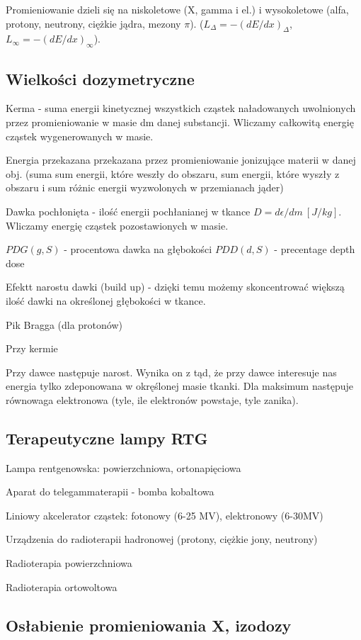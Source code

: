 \documentclass{article}
\begin{document}
Promieniowanie dzieli się na niskoletowe (X, gamma i el.) i wysokoletowe (alfa, protony, neutrony, ciężkie jądra, mezony $\pi$). ($L_{\Delta} = -(dE/dx)_{\Delta}$, $L_{\infty} = -(dE/dx)_{\infty}$).

\subsection{Wielkości dozymetryczne}

Kerma - suma energii kinetycznej wszystkich cząstek naładowanych uwolnionych przez promieniowanie w masie dm danej substancji. Wliczamy całkowitą energię cząstek wygenerowanych w masie.

Energia przekazana przekazana przez promieniowanie jonizujące materii w danej obj. (suma sum energii, które weszły do obszaru, sum energii, które wyszły z obszaru i sum różnic energii wyzwolonych w przemianach jąder)

Dawka pochłonięta - ilość energii pochłanianej w tkance $D = d\epsilon / dm~[J/kg]$. Wliczamy energię cząstek pozostawionych w masie.

$PDG(g,S)$ - procentowa dawka na głębokości
$PDD(d,S)$ - precentage depth dose

Efektt narostu dawki (build up) - dzięki temu możemy skoncentrować większą ilość dawki na określonej głębokości w tkance.

Pik Bragga (dla protonów)

Przy kermie 

Przy dawce następuje narost. Wynika on z tąd, że przy dawce interesuje nas energia tylko zdeponowana w okręślonej masie tkanki. Dla maksimum następuje równowaga elektronowa (tyle, ile elektronów powstaje, tyle zanika).

\subsection{Terapeutyczne lampy RTG}

Lampa rentgenowska: powierzchniowa, ortonapięciowa

Aparat do telegammaterapii - bomba kobaltowa

Liniowy akcelerator cząstek: fotonowy (6-25 MV), elektronowy (6-30MV)

Urządzenia do radioterapii hadronowej (protony, ciężkie jony, neutrony)

Radioterapia powierzchniowa

Radioterapia ortowoltowa

\subsection{Osłabienie promieniowania X, izodozy}
\end{document}
